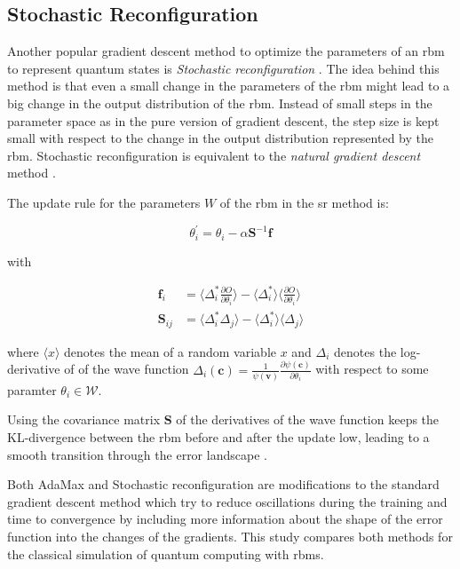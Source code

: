 \subsection{Stochastic Reconfiguration}
Another popular gradient descent method to optimize the parameters of an \gls{rbm} to represent quantum states is 
\textit{Stochastic reconfiguration} \cite{sorella1998green}. The idea behind this method is that even a small change in the 
parameters of the \gls{rbm} might lead to a big change in the output distribution of the \gls{rbm}. Instead of small steps
 in the parameter space as in the pure version of gradient descent, the step size is kept small 
with respect to the change in the output distribution represented by the \gls{rbm}. Stochastic reconfiguration is equivalent 
to the \textit{natural gradient descent} method \cite{amari1998natural}.

The update rule for the parameters $W$ of the \gls{rbm} in the \gls{sr} method is:

\begin{equation}
    \theta_i^{\prime} = \theta_i - \alpha \bm{S}^{-1} \bm{f}
\end{equation}

with

\begin{align}
    \bm{f}_i &= \langle \Delta_i^* \frac{\partial O}{\partial \theta_i} \rangle - \langle \Delta_i^* \rangle \langle \frac{\partial O}{\partial \theta_i} \rangle \\
    \bm{S}_{ij} &= \langle \Delta_i^* \Delta_j \rangle - \langle \Delta_i^* \rangle \langle \Delta_j \rangle
\end{align}

where $\langle x \rangle$ denotes the mean of a random variable $x$ and $\Delta_i$ denotes the log-derivative of 
of the wave function $\Delta_i(\bm{c}) = \frac{1}{\psi(\bm{v})}\frac{\partial \psi(\bm{c})}{\partial \theta_i}$ with 
respect to some paramter $\theta_i \in \mathcal{W}$.

Using the covariance matrix $\bm{S}$ of the derivatives of the wave function keeps the KL-divergence between 
the \gls{rbm} before and after the update low, leading to a smooth transition through the error landscape \cite{sorella1998green}.

Both AdaMax and Stochastic reconfiguration are modifications to the standard gradient descent method which 
try to reduce oscillations during the training and time to convergence by including more information about the 
shape of the error function into the changes of the gradients. This study compares both methods for the classical simulation of quantum computing with \gls{rbm}s.

